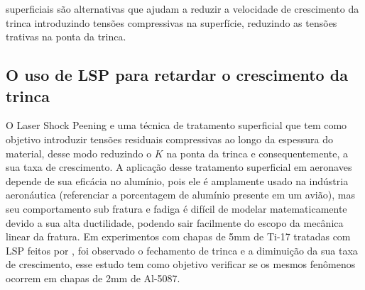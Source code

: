 superficiais são alternativas que ajudam a reduzir a velocidade de crescimento da trinca introduzindo tensões compressivas na superfície, reduzindo as tensões trativas na ponta da trinca.
	
	\subsection{O uso de LSP para retardar o crescimento da trinca}
	O Laser Shock Peening e uma técnica de tratamento superficial que tem como objetivo introduzir tensões residuais compressivas ao longo da espessura do material, desse modo reduzindo o $K$ na ponta da trinca e consequentemente, a sua taxa de crescimento. A aplicação desse tratamento superficial em aeronaves depende de sua eficácia no alumínio, pois ele é amplamente usado na indústria aeronáutica (referenciar a porcentagem de alumínio presente em um avião), mas seu comportamento sub fratura e fadiga é difícil de modelar matematicamente devido a sua alta ductilidade, podendo sair facilmente do escopo da mecânica linear da fratura. Em experimentos com chapas de 5mm de Ti-17 tratadas com LSP feitos por \textcite{SUN2021106081}, foi observado o fechamento de trinca e a diminuição da sua taxa de crescimento, esse estudo tem como objetivo verificar se os mesmos fenômenos ocorrem em chapas de 2mm de Al-5087.
	
    
    
    
    
    
    
    

	
